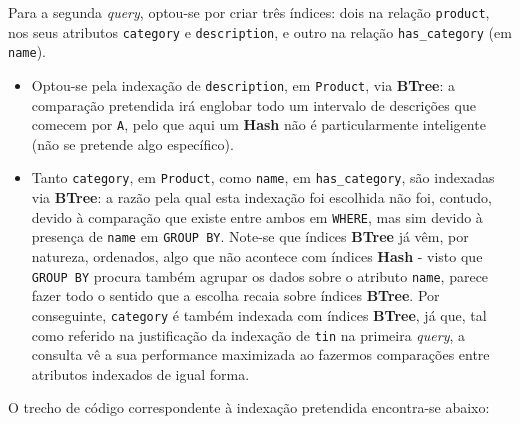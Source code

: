\documentclass[12pt,a4paper]{article}
\begin{document}


Para a segunda \textit{query}, optou-se por criar três índices: dois na relação
\texttt{product}, nos seus atributos \texttt{category} e \texttt{description},
e outro na relação \texttt{has\_category} (em \texttt{name}).

\vspace*{0.25cm}

\begin{itemize}
  \item Optou-se pela indexação de \texttt{description}, em \texttt{Product},
        via \textbf{BTree}: a comparação pretendida irá englobar todo um intervalo
        de descrições que comecem por \texttt{A}, pelo que aqui um \textbf{Hash}
        não é particularmente inteligente (não se pretende algo específico).
  \item Tanto \texttt{category}, em \texttt{Product}, como \texttt{name}, em \texttt{has\_category},
        são indexadas via \textbf{BTree}: a razão pela qual esta indexação foi escolhida
        não foi, contudo, devido à comparação que existe entre ambos em \texttt{WHERE},
        mas sim devido à presença de \texttt{name} em \texttt{GROUP BY}. Note-se que
        índices \textbf{BTree} já vêm, por natureza, ordenados, algo que não
        acontece com índices \textbf{Hash} - visto que \texttt{GROUP BY} procura
        também agrupar os dados sobre o atributo \texttt{name}, parece fazer todo
        o sentido que a escolha recaia sobre índices \textbf{BTree}. Por conseguinte,
        \texttt{category} é também indexada com índices \textbf{BTree}, já que, tal como referido na justificação
        da indexação de \texttt{tin} na primeira \textit{query}, a consulta
        vê a sua performance maximizada ao fazermos comparações entre atributos
        indexados de igual forma.
\end{itemize}

O trecho de código correspondente à indexação pretendida encontra-se abaixo:


\end{document}
